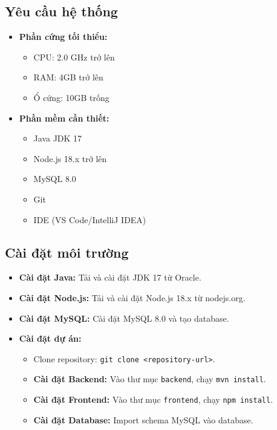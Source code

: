\documentclass[a4paper,12pt]{article}
\begin{document}
	\subsection{Yêu cầu hệ thống}
	\begin{itemize}
		\item \textbf{Phần cứng tối thiểu:}
		\begin{itemize}
			\item CPU: 2.0 GHz trở lên
			\item RAM: 4GB trở lên
			\item Ổ cứng: 10GB trống
		\end{itemize}
		\item \textbf{Phần mềm cần thiết:}
		\begin{itemize}
			\item Java JDK 17
			\item Node.js 18.x trở lên
			\item MySQL 8.0
			\item Git
			\item IDE (VS Code/IntelliJ IDEA)
		\end{itemize}
	\end{itemize}
	
	\subsection{Cài đặt môi trường}
	\begin{itemize}
		\item \textbf{Cài đặt Java:} Tải và cài đặt JDK 17 từ Oracle.
		\item \textbf{Cài đặt Node.js:} Tải và cài đặt Node.js 18.x từ nodejs.org.
		\item \textbf{Cài đặt MySQL:} Cài đặt MySQL 8.0 và tạo database.
		\item \textbf{Cài đặt dự án:}
		\begin{itemize}
			\item Clone repository: \texttt{git clone <repository-url>}.
			\item \textbf{Cài đặt Backend:} Vào thư mục \texttt{backend}, chạy \texttt{mvn install}.
			\item \textbf{Cài đặt Frontend:} Vào thư mục \texttt{frontend}, chạy \texttt{npm install}.
			\item \textbf{Cài đặt Database:} Import schema MySQL vào database.
		\end{itemize}
	\end{itemize}
	
\end{document}

